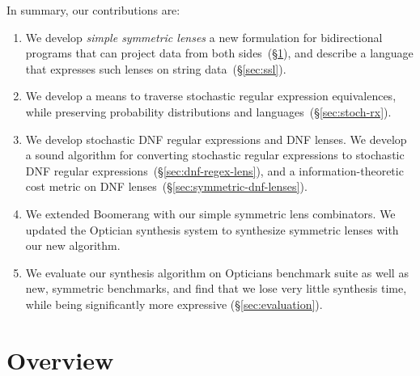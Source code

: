 \documentclass[acmsmall,screen,anonymous]{acmart}
\begin{document}
In summary, our contributions are:
\begin{enumerate}
\item We develop \emph{simple symmetric lenses} a new formulation for
  bidirectional programs that can project data from both sides~(\S\ref{sec:overview}),
  and describe a language that expresses such lenses on string
  data~(\S\ref{sec:ssl}).
\item We develop a means to traverse stochastic regular expression equivalences,
  while preserving probability distributions and
  languages~(\S\ref{sec:stoch-rx}).
\item We develop stochastic DNF regular expressions and DNF lenses. We develop a
  sound algorithm for converting stochastic regular expressions to stochastic
  DNF regular expressions~(\S\ref{sec:dnf-regex-lens}), and a
  information-theoretic cost metric on DNF
  lenses~(\S\ref{sec:symmetric-dnf-lenses}).
\item We extended Boomerang with our simple symmetric lens combinators. We
  updated the Optician synthesis system to synthesize symmetric lenses with our
  new algorithm.
\item We evaluate our synthesis algorithm on Opticians benchmark suite as well
  as new, symmetric benchmarks, and find that we lose very little synthesis
  time, while being significantly more expressive (\S\ref{sec:evaluation}).
\end{enumerate}

\section{Overview}
\label{sec:overview}
\end{document}
